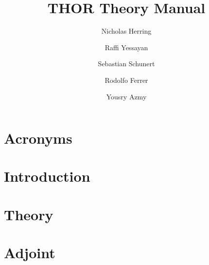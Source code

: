\documentclass[twoside]{report}
\title{THOR Theory Manual}
\author[1]{Nicholas Herring}
\author[1]{Raffi Yessayan}
\author[2]{Sebastian Schunert}
\author[3]{Rodolfo Ferrer}
\author[1]{Yousry Azmy}
\affil[1]{North Carolina State University}
\affil[2]{Idaho National Laboratory}
\affil[3]{The Pennsylvania State University}
\begin{document}



%

\chapter*{Acronyms}


\tableofcontents


\clearpage
{}
\pagestyle{fancy}

\chapter{Introduction}



\chapter{Theory}



\chapter{Adjoint}






\end{document}
